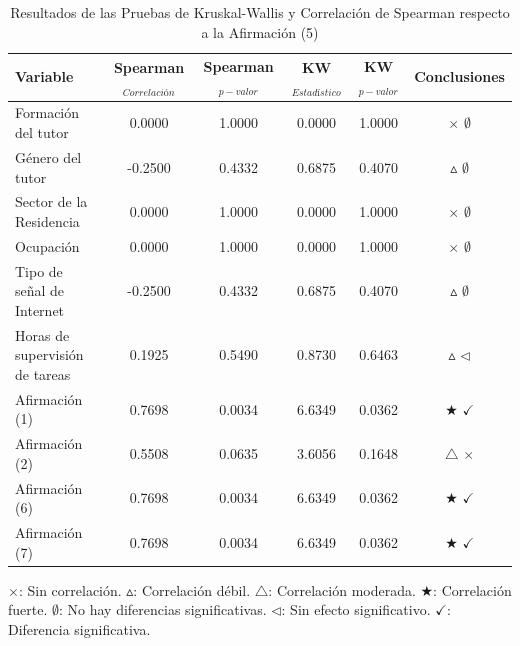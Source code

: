 \begin{table}[h!]
\centering
\caption{Resultados de las Pruebas de Kruskal-Wallis y Correlación de Spearman respecto a la Afirmación (5)}
\begin{tabularx}{\textwidth}{Xccccc}
	\toprule
	\textbf{Variable} & \textbf{Spearman$_{Correlación}$} & \textbf{Spearman$_{p-valor}$} & \textbf{KW$_{Estadístico}$} & \textbf{KW$_{p-valor}$} & \textbf{Conclusiones} \\
	\midrule
	Formación del tutor & 0.0000 & 1.0000 & 0.0000 & 1.0000 & \(\times\) \(\emptyset\) \\ %
	Género del tutor & -0.2500 & 0.4332 & 0.6875 & 0.4070 & \(\vartriangle\) \(\emptyset\) \\ %
	Sector de la Residencia & 0.0000 & 1.0000 & 0.0000 & 1.0000 & \(\times\) \(\emptyset\) \\ %
	Ocupación & 0.0000 & 1.0000 & 0.0000 & 1.0000 & \(\times\) \(\emptyset\) \\ %
	Tipo de señal de Internet & -0.2500 & 0.4332 & 0.6875 & 0.4070 & \(\vartriangle\) \(\emptyset\) \\ %
	Horas de supervisión de tareas & 0.1925 & 0.5490 & 0.8730 & 0.6463 & \(\vartriangle\) \(\triangleleft\) \\ %
	Afirmación (1) & 0.7698 & 0.0034 & 6.6349 & 0.0362 & \(\bigstar\) \(\checkmark\) \\ %
	Afirmación (2) & 0.5508 & 0.0635 & 3.6056 & 0.1648 & \(\triangle\) \(\times\) \\ %
	Afirmación (6) & 0.7698 & 0.0034 & 6.6349 & 0.0362 & \(\bigstar\) \(\checkmark\) \\ %
	Afirmación (7) & 0.7698 & 0.0034 & 6.6349 & 0.0362 & \(\bigstar\) \(\checkmark\) \\ %
	\bottomrule
\end{tabularx}
\label{table:kruskal-spearman-results}
\parbox{\textwidth}{\footnotesize 
	\(\times\): Sin correlación. \(\vartriangle\): Correlación débil. \(\triangle\): Correlación moderada. \(\bigstar\): Correlación fuerte. \(\emptyset\): No hay diferencias significativas.  \(\triangleleft\): Sin efecto significativo. \(\checkmark\): Diferencia significativa.
}
\end{table}

